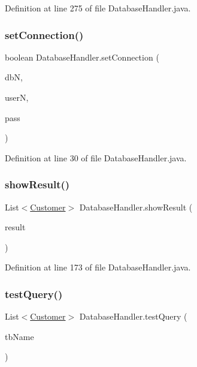 Definition at line 275 of file Database\+Handler.\+java.

\mbox{\label{class_database_handler_a8e77ef24c744312d8124bde6b7efd29f}} 
\subsubsection{\texorpdfstring{setConnection()}{setConnection()}}
{\footnotesize\ttfamily boolean Database\+Handler.\+set\+Connection (\begin{DoxyParamCaption}\item[{String}]{dbN,  }\item[{String}]{userN,  }\item[{String}]{pass }\end{DoxyParamCaption})}



Definition at line 30 of file Database\+Handler.\+java.

\mbox{\label{class_database_handler_a8130c818781d7b48cb2d46ae77090792}} 
\subsubsection{\texorpdfstring{showResult()}{showResult()}}
{\footnotesize\ttfamily List$<$\mbox{\hyperlink{class_customer}{Customer}}$>$ Database\+Handler.\+show\+Result (\begin{DoxyParamCaption}\item[{Result\+Set}]{result }\end{DoxyParamCaption})}



Definition at line 173 of file Database\+Handler.\+java.

\mbox{\label{class_database_handler_ac6ac13dad637b902451a26d621d22cf2}} 
\subsubsection{\texorpdfstring{testQuery()}{testQuery()}}
{\footnotesize\ttfamily List$<$\mbox{\hyperlink{class_customer}{Customer}}$>$ Database\+Handler.\+test\+Query (\begin{DoxyParamCaption}\item[{String}]{tb\+Name }\end{DoxyParamCaption})}



